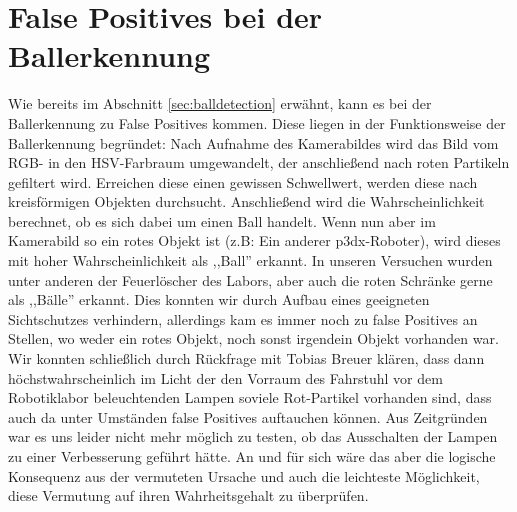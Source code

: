 
\section{False Positives bei der Ballerkennung}
\label{sec:false-positives-bei}
Wie bereits im Abschnitt \ref{sec:balldetection} erwähnt, kann es bei
der Ballerkennung zu False Positives kommen. Diese liegen in der
Funktionsweise der Ballerkennung begründet: Nach Aufnahme des
Kamerabildes wird das Bild vom RGB- in den HSV-Farbraum umgewandelt,
der anschließend nach roten Partikeln gefiltert wird. Erreichen diese
einen gewissen Schwellwert, werden diese nach kreisförmigen Objekten
durchsucht. Anschließend wird die Wahrscheinlichkeit berechnet, ob es
sich dabei um einen Ball handelt. Wenn nun aber im Kamerabild so ein
rotes Objekt ist (z.B: Ein anderer p3dx-Roboter), wird dieses mit
hoher Wahrscheinlichkeit als ,,Ball'' erkannt. In unseren Versuchen
wurden unter anderen der Feuerlöscher des Labors, aber auch die roten
Schränke gerne als ,,Bälle'' erkannt. Dies konnten wir durch Aufbau
eines geeigneten Sichtschutzes verhindern, allerdings kam es immer
noch zu false Positives an Stellen, wo weder ein rotes Objekt, noch
sonst irgendein Objekt vorhanden war. Wir konnten schließlich durch
Rückfrage mit Tobias Breuer klären, dass dann höchstwahrscheinlich im
Licht der den Vorraum des Fahrstuhl vor dem Robotiklabor beleuchtenden
Lampen soviele Rot-Partikel vorhanden sind, dass auch da unter
Umständen false Positives auftauchen können. Aus Zeitgründen war es
uns leider nicht mehr möglich zu testen, ob das Ausschalten der Lampen
zu einer Verbesserung geführt hätte. An und für sich wäre das aber die
logische Konsequenz aus der vermuteten Ursache und auch die leichteste
Möglichkeit, diese Vermutung auf ihren Wahrheitsgehalt zu überprüfen.

